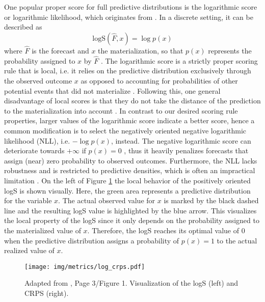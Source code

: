 \documentclass[a4paper,oneside,bibliography=totoc]{scrbook}
\begin{document}
\noindent
One popular proper score for full predictive distributions is the logarithmic score or logarithmic likelihood, which originates from \citet{good_rational_1952}. In a discrete setting, it can be described as
\begin{equation}
    \text{logS}(\hat{F},x)= \log p(x)
    \label{eq:NLL}
\end{equation}
where $\hat{F}$ is the forecast and $x$ the materialization, so that $p(x)$ represents the probability assigned to $x$ by $\hat{F}$ \cite{bracher_evaluating_2021}. 
The logarithmic score is a strictly proper scoring rule that is local, i.e. it relies on the predictive distribution exclusively through the observed outcome $x$ as opposed to accounting for probabilities of other potential events that did not materialize \cite{bernardo_expected_1979, gneiting_strictly_2007, dawid_theory_2014, tyralis_review_2024}. 
Following this, one general disadvantage of local scores is that they do not take the distance of the prediction to the materialization into account \cite{gneiting_strictly_2007}.
In contrast to our desired scoring rule properties, larger values of the logarithmic score indicate a better score, hence a common modification is to select the negatively oriented negative logarithmic likelihood (NLL), i.e. $-\log p(x)$, instead. The negative logarithmic score can deteriorate towards $+\infty$ if $p(x)=0$ \cite{bracher_evaluating_2021}, thus it heavily penalizes forecasts that assign (near) zero probability to observed outcomes. 
Furthermore, the NLL lacks robustness and is restricted to predictive densities, which is often an impractical limitation \cite{gneiting_strictly_2007}.
On the left of Figure \ref{fig:log_crps} the local behavior of the positively oriented logS is shown visually.
Here, the green area represents a predictive distribution for the variable $x$. 
The actual observed value for $x$ is marked by the black dashed line and the resulting logS value is highlighted by the blue arrow. This visualizes the local property of the logS since it only depends on the probability assigned to the materialized value of $x$.
Therefore, the logS reaches its optimal value of 0 when the predictive distribution assigns a probability of $p(x)=1$ to the actual realized value of $x$.
\begin{figure}%
    \centering
    \texttt{[image: img/metrics/log\_crps.pdf]}  %
    \caption{Adapted from \citet{bracher_evaluating_2021}, Page 3/Figure 1. Visualization of the logS (left) and CRPS (right).}
    \label{fig:log_crps}
\end{figure}
\newline
\end{document}
